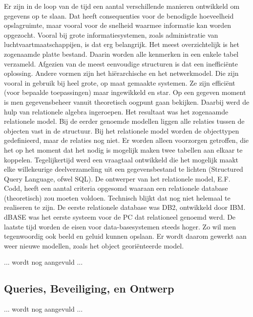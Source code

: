 Er zijn in de loop van de tijd een aantal verschillende manieren ontwikkeld om gegevens op te slaan. Dat heeft consequenties voor de benodigde hoeveelheid opslagruimte, maar vooral voor de snelheid waarmee informatie kan worden opgezocht. Vooral bij grote informatiesystemen, zoals administratie van luchtvaartmaatschappijen, is dat erg belangrijk. Het meest overzichtelijk is het zogenaamde platte bestand. Daarin worden alle kenmerken in een enkele tabel verzameld. Afgezien van de meest eenvoudige structuren is dat een inefficiënte oplossing. Andere vormen zijn het hiërarchische en het netwerkmodel. Die zijn vooral in gebruik bij heel grote, op maat gemaakte systemen. Ze zijn efficiënt (voor bepaalde toepassingen) maar ingewikkeld en star. Op een gegeven moment is men gegevensbeheer vanuit theoretisch oogpunt gaan bekijken. Daarbij werd de hulp van relationele algebra ingeroepen. Het resultaat was het zogenaamde relationele model. Bij de eerder genoemde modellen liggen alle relaties tussen de objecten vast in de structuur. Bij het relationele model worden de objecttypen gedefinieerd, maar de relaties nog niet. Er worden alleen voorzorgen getroffen, die het op het moment dat het nodig is mogelijk maken twee tabellen aan elkaar te koppelen. Tegelijkertijd werd een vraagtaal ontwikkeld die het mogelijk maakt elke willekeurige deelverzameling uit een gegevensbestand te lichten (Structured Query Language, ofwel SQL). De ontwerper van het relationele model, E.F. Codd, heeft een aantal criteria opgesomd waaraan een relationele database (theoretisch) zou moeten voldoen. Technisch blijkt dat nog niet helemaal te realiseren te zijn. De eerste relationele database was DB2, ontwikkeld door IBM. dBASE was het eerste systeem voor de PC dat relationeel genoemd werd. De laatste tijd worden de eisen voor data-basesystemen steeds hoger. Zo wil men tegenwoordig ook beeld en geluid kunnen opslaan. Er wordt daarom gewerkt aan weer nieuwe modellen, zoals het object georiënteerde model.

... wordt nog aangevuld ...

\subsection{Queries, Beveiliging, en Ontwerp}

... wordt nog aangevuld ...